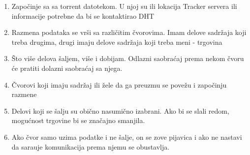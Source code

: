 \documentclass{article} %
\begin{document}
\begin{enumerate}
	\item Zapo\v cinje sa sa torrent datotekom. U njoj su ili lokacija  Tracker servera ili informacije potrebne da bi se kontaktirao DHT
	\item Razmena podataka se vr\v si sa razli\v citim \v cvorovima. Imam delove sadr\v zaja koji treba drugima, drugi imaju delove sadr\v zaja koji treba meni - trgovina
	\item \v Sto vi\v se delova \v saljem, vi\v se i dobijam. Odlazni saobra\' caj prema nekom \v cvoru \' ce pratiti dolazni saobra\' caj sa njega.
	\item \v Cvorovi koji imaju sadr\v zaj ili \v zele da ga preuzmu se pove\v zu i zapo\v cinju razmene
	\item Delovi koji se \v salju su obi\v cno nasumi\v cno izabrani. Ako bi se slali redom, mogu\' cnost trgovine bi se zna\v cajno smanjila.
	\item Ako \v cvor samo uzima podatke i ne \v salje, on se zove pijavica i ako ne nastavi da sara\dj uje komunikacija prema njemu se obustavlja.
\end{enumerate}
\end{document}
